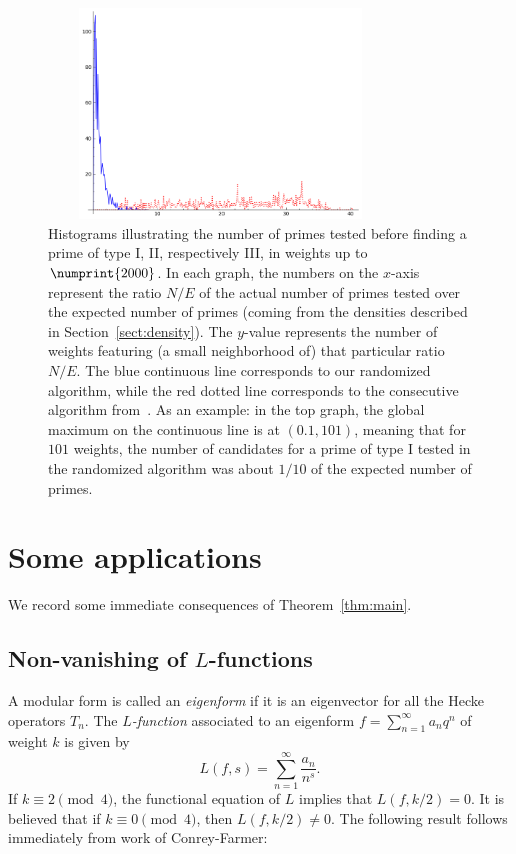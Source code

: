 \documentclass[11pt]{article}
\theoremstyle{plain}
\theoremstyle{definition}
\theoremstyle{remark}
\numberwithin{equation}{section}
\begin{document}
\begin{figure}[h]
\begin{center}
  \qquad
\includegraphics[width=3.6in, height=2.2in]{type3.png}
\end{center}
\caption{Histograms illustrating the number of primes tested before finding a
  prime of type I, II, respectively III, in weights up to $\numprint{2000}$.  
  In each graph, the numbers on the
$x$-axis represent the ratio $N/E$ of the actual number of primes tested over
the expected number of primes (coming from the densities described in
Section~\ref{sect:density}).  The $y$-value represents the number of weights
featuring (a small neighborhood of) that particular ratio $N/E$.  The blue 
continuous line corresponds to our randomized algorithm, while the red dotted 
line corresponds to the consecutive algorithm from~\cite{ConreyFarmer}.  
As an example: in the top graph, the global maximum on the continuous line is
at $(0.1, 101)$, meaning that for $101$ weights, the number of candidates for
a prime of type I tested in the randomized algorithm was about $1/10$ of the 
expected number of primes.}
\label{fig:histogram}
\end{figure}


\section{Some applications}
\label{sect:applications}

We record some immediate consequences of Theorem~\ref{thm:main}.

\subsection{Non-vanishing of $L$-functions}
A modular form is called an \emph{eigenform} if it is an eigenvector for all
the Hecke operators $T_n$.
The \emph{$L$-function} associated to an eigenform 
$f=\sum_{n=1}^\infty a_n q^n$ of weight $k$ is given by
\begin{equation*}
  L(f, s)=\sum_{n=1}^\infty \frac{a_n}{n^s}.
\end{equation*}
If $k\equiv 2\pmod{4}$, the functional equation of $L$ implies that
$L(f, k/2)=0$.  It is believed that if $k\equiv 0\pmod{4}$, then $L(f, k/2)\neq
0$.  The following result follows immediately from work of Conrey-Farmer: 
\end{document}
